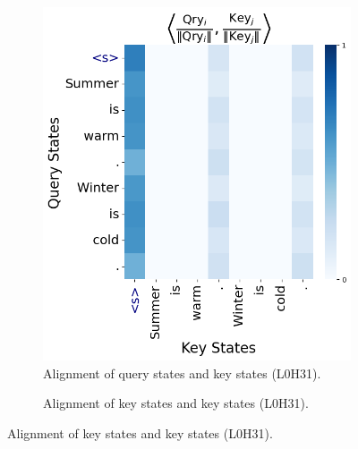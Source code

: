\begin{figure}[h]
    \centering
    \begin{subfigure}[t]{0.49\textwidth}
    \caption{Alignment of query states and key states (L0H31).}
        \includegraphics[width=\textwidth]{Figures/llama_31_circuit/llama_31_qk_l0.png}
    \end{subfigure}
    \hfill
    \begin{subfigure}[t]{0.49\textwidth}
        \caption{Alignment of key states and key states (L0H31).}

\end{subfigure}
\end{figure}
